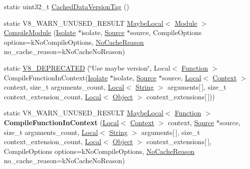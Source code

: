 \begin{DoxyCompactItemize}
\item 
static uint32\+\_\+t \mbox{\hyperlink{classv8_1_1ScriptCompiler_aea78877b0dccde1e587ee1ddeda1c155}{Cached\+Data\+Version\+Tag}} ()
\item 
static V8\+\_\+\+W\+A\+R\+N\+\_\+\+U\+N\+U\+S\+E\+D\+\_\+\+R\+E\+S\+U\+LT \mbox{\hyperlink{classv8_1_1MaybeLocal}{Maybe\+Local}}$<$ \mbox{\hyperlink{classv8_1_1Module}{Module}} $>$ \mbox{\hyperlink{classv8_1_1ScriptCompiler_a7a735ad28cd9925ef67c57a76422116c}{Compile\+Module}} (\mbox{\hyperlink{classv8_1_1Isolate}{Isolate}} $\ast$isolate, \mbox{\hyperlink{classv8_1_1ScriptCompiler_1_1Source}{Source}} $\ast$source, Compile\+Options options=k\+No\+Compile\+Options, \mbox{\hyperlink{classv8_1_1ScriptCompiler_a7f13fa15484cfc500ae51927756e0d60}{No\+Cache\+Reason}} no\+\_\+cache\+\_\+reason=k\+No\+Cache\+No\+Reason)
\item 
static \mbox{\hyperlink{classv8_1_1ScriptCompiler_adf81ab5e29be4318043f4fe76f2130bb}{V8\+\_\+\+D\+E\+P\+R\+E\+C\+A\+T\+ED}} (\char`\"{}Use maybe version\char`\"{}, Local$<$ \mbox{\hyperlink{classv8_1_1Function}{Function}} $>$ Compile\+Function\+In\+Context(\mbox{\hyperlink{classv8_1_1Isolate}{Isolate}} $\ast$isolate, \mbox{\hyperlink{classv8_1_1ScriptCompiler_1_1Source}{Source}} $\ast$source, \mbox{\hyperlink{classv8_1_1Local}{Local}}$<$ \mbox{\hyperlink{classv8_1_1Context}{Context}} $>$ context, size\+\_\+t arguments\+\_\+count, \mbox{\hyperlink{classv8_1_1Local}{Local}}$<$ \mbox{\hyperlink{classv8_1_1String}{String}} $>$ arguments\mbox{[}$\,$\mbox{]}, size\+\_\+t context\+\_\+extension\+\_\+count, \mbox{\hyperlink{classv8_1_1Local}{Local}}$<$ \mbox{\hyperlink{classv8_1_1Object}{Object}} $>$ context\+\_\+extensions\mbox{[}$\,$\mbox{]}))
\item 
\mbox{\label{classv8_1_1ScriptCompiler_ad3e6937d7ea91ac92d22a3f48844fb57}} 
static V8\+\_\+\+W\+A\+R\+N\+\_\+\+U\+N\+U\+S\+E\+D\+\_\+\+R\+E\+S\+U\+LT \mbox{\hyperlink{classv8_1_1MaybeLocal}{Maybe\+Local}}$<$ \mbox{\hyperlink{classv8_1_1Function}{Function}} $>$ {\bfseries Compile\+Function\+In\+Context} (\mbox{\hyperlink{classv8_1_1Local}{Local}}$<$ \mbox{\hyperlink{classv8_1_1Context}{Context}} $>$ context, \mbox{\hyperlink{classv8_1_1ScriptCompiler_1_1Source}{Source}} $\ast$source, size\+\_\+t arguments\+\_\+count, \mbox{\hyperlink{classv8_1_1Local}{Local}}$<$ \mbox{\hyperlink{classv8_1_1String}{String}} $>$ arguments\mbox{[}$\,$\mbox{]}, size\+\_\+t context\+\_\+extension\+\_\+count, \mbox{\hyperlink{classv8_1_1Local}{Local}}$<$ \mbox{\hyperlink{classv8_1_1Object}{Object}} $>$ context\+\_\+extensions\mbox{[}$\,$\mbox{]}, Compile\+Options options=k\+No\+Compile\+Options, \mbox{\hyperlink{classv8_1_1ScriptCompiler_a7f13fa15484cfc500ae51927756e0d60}{No\+Cache\+Reason}} no\+\_\+cache\+\_\+reason=k\+No\+Cache\+No\+Reason)

\end{DoxyCompactItemize}

